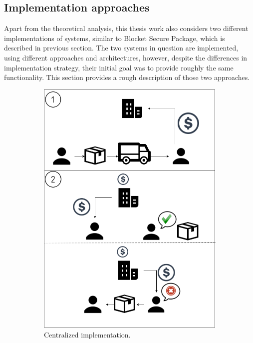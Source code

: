 \subsection{Implementation approaches}

Apart from the theoretical analysis, this thesis work also considers two different implementations of systems, similar to Blocket Secure Package, which is described in previous section. The two systems in question are implemented, using different approaches and architectures, however, despite the differences in implementation strategy, their initial goal was to provide roughly the same functionality. This section provides a rough description of those two approaches.

\begin{figure}[H]
\centering
\begin{subfigure}{.478\textwidth}
\centering
\includegraphics[width=.9\linewidth]{images/originalservice.png}
\caption{Centralized implementation.}
\label{fig:orig}
\end{subfigure}%
\begin{subfigure}{.435\textwidth}

\end{subfigure}
\end{figure}
